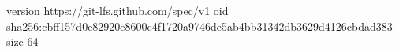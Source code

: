 version https://git-lfs.github.com/spec/v1
oid sha256:cbff157d0e82920e8600c4f1720a9746de5ab4bb31342db3629d4126cbdad383
size 64
